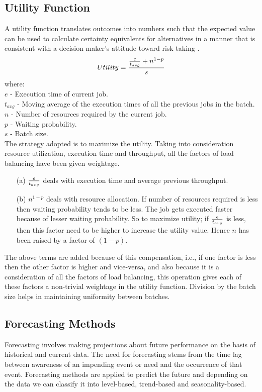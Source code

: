 \subsection{Utility Function}
A utility function translates outcomes into numbers such that the expected value can be used to calculate certainty equivalents for alternatives in a manner that is consistent with a decision maker's attitude toward risk taking \cite{Book}.\\
\begin{displaymath}
Utility = { \frac{e}{t_{avg}} + n^{1-p} \over s}
\end{displaymath}
where:\\
$e$ - Execution time of current job.\\
$t_{avg}$ - Moving average of the execution times of all the previous jobs in the batch.\\
$n$ - Number of resources required by the current job.\\
$p$ - Waiting probability.\\
$s$ - Batch size.\\
The strategy adopted is to maximize the utility. Taking into consideration resource utilization, execution time and throughput, all the factors of load balancing have been given weightage.
\begin{enumerate}
\item[(a)] $e \over t_{avg}$ deals with execution time and average previous throughput. 
\item[(b)] $n^{1-p}$ deals with resource allocation. If number of resources required is less then waiting probability tends to be less. The job gets executed faster because of lesser waiting probability. So to maximize utility; if $e \over t_{avg}$ is less, then this factor need to be higher to increase the utility value. Hence $n$ has been raised by a factor of $(1-p)$.
\end{enumerate}
The above terms are added because of this compensation, i.e., if one factor is less then the other factor is higher and vice-versa, and also because it is a consideration of all the factors of load balancing,  this operation gives each of these factors a non-trivial weightage in the utility function. Division by the batch size helps in maintaining uniformity between batches.
\subsection{Forecasting Methods}
Forecasting involves making projections about future performance on the basis of historical and current data. The need for forecasting stems from the time lag between awareness of an impending event or need and the occurrence of that event. Forecasting methods are applied to predict the future and depending on the data we can classify it into level-based, trend-based and seasonality-based.
